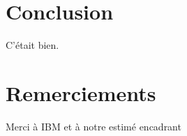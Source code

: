 \section*{Conclusion}

C'était bien.

\section*{Remerciements}

Merci à IBM et à notre estimé encadrant

